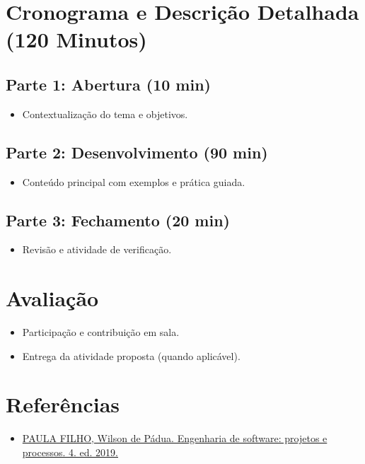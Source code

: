 \documentclass[12pt,a4paper]{article}
\begin{document}
\section{Cronograma e Descrição Detalhada (120 Minutos)}
\subsection*{Parte 1: Abertura (10 min)}
\begin{itemize}[leftmargin=*,itemsep=0.35em]
  \item Contextualização do tema e objetivos.
\end{itemize}

\subsection*{Parte 2: Desenvolvimento (90 min)}
\begin{itemize}[leftmargin=*,itemsep=0.35em]
  \item Conteúdo principal com exemplos e prática guiada.
\end{itemize}

\subsection*{Parte 3: Fechamento (20 min)}
\begin{itemize}[leftmargin=*,itemsep=0.35em]
  \item Revisão e atividade de verificação.
\end{itemize}

\section{Avaliação}
\begin{itemize}[leftmargin=*,itemsep=0.25em]
  \item Participação e contribuição em sala.
  \item Entrega da atividade proposta (quando aplicável).
\end{itemize}

\section{Referências}
\begin{itemize}[leftmargin=*,itemsep=0.25em]
  \item \href{../99-Materiais/Engenharia%20de%20software%20projetos%20e%20processos%20by%20Wilson%20de%20P%C3%A1dua%20Paula%20Filho%20.epub.pdf}{PAULA FILHO, Wilson de Pádua. Engenharia de software: projetos e processos. 4. ed. 2019.}
\end{itemize}
\end{document}
